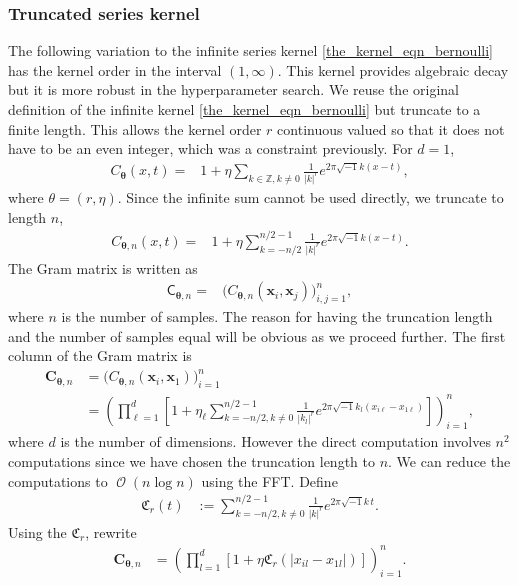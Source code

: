 \documentclass{svjour3}                     %
\DeclareMathOperator{\Order}{{\mathcal O}}
\newcommand{\bm}[1]{\boldsymbol{#1}}
\newcommand{\vtheta}{{\bm{\theta}}}
\newcommand{\vC}{\bm{C}}
\newcommand{\vx}{\bm{x}}
\newcommand{\mC}{\mathsf{C}}
\def\abs#1{\ensuremath{\left \lvert #1 \right \rvert}}
\begin{document}
\subsubsection{Truncated series kernel}
\label{sec:trunc_series_kernel}
The following variation to the infinite series kernel \eqref{the_kernel_eqn_bernoulli} has the kernel order in the interval $(1, \infty)$. This kernel provides algebraic decay but it is more robust in the hyperparameter search.
We reuse the original definition of the infinite kernel \eqref{the_kernel_eqn_bernoulli} but truncate to a finite length. This allows the kernel order $r$ continuous valued so that it does not have to be an even integer,  which was a constraint previously. 
For $d=1$,
\begin{align*}
C_\vtheta(x, t) = & 1 + \eta \sum_{k \in \mathbb{Z}, k \neq 0 } \frac{1}{\abs{k}^r} 
e^{ 2 \pi\sqrt{-1} k (x-t)},
\end{align*}
where $\theta = (r, \eta)$. 
Since the infinite sum cannot be used directly, we truncate to length $n$,
\begin{align*}
C_{\vtheta, n}(x, t) = & 1 + \eta \sum_{k = - n/2 }^{n/2 - 1} \frac{1}{\abs{k}^r} 
e^{ 2 \pi\sqrt{-1} k (x-t)}.
\end{align*}
The Gram matrix is written as 
\begin{align*}
\mC_{\vtheta, n} = & \biggl( C_{\vtheta, n}(\vx_i, \vx_j) \biggr)_{i,j=1}^n,
\end{align*}
where $n$ is the number of samples. 
The reason for having the truncation length and the number of samples equal will be obvious as we proceed further.
The first column of the Gram matrix is
\begin{align*}
\vC_{\vtheta, n} &= \biggl( C_{\vtheta, n}(\vx_i, \vx_1) \biggr)_{i=1}^n
\\
&= \left( \prod_{\ell=1}^d \left[ 1 + \eta_\ell \sum_{k = - n/2, k \neq 0 }^{n/2 - 1} \frac{1}{\abs{k_l}^r} 
e^{ 2 \pi\sqrt{-1} k_l (x_{i\ell}-x_{1\ell})}\right] \right)_{i=1}^n, 
\end{align*}
where $d$ is the number of dimensions. 
However the direct computation involves $n^2$ computations since we have chosen the truncation length to $n$. We can reduce the computations to $\Order(n\log n)$ using the FFT.
Define
\begin{align*}
\mathfrak{C}_r(t) &:= \sum_{k = - n/2, k \neq 0 }^{n/2 -1} \frac{1}{\abs{k}^r} 
e^{ 2 \pi\sqrt{-1} k\, t}.
\end{align*}
Using the $\mathfrak{C}_r$, rewrite
\begin{align}
\label{eqn:trunc_series_kernel}
\vC_{\vtheta, n}
&= \left( \prod_{l=1}^d \left[ 1 + \eta \mathfrak{C}_r( \abs{x_{il} - x_{1l}})\right] \right)_{i=1}^n.
\end{align}
\end{document}

